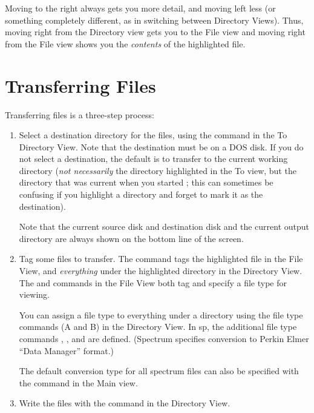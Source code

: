 Moving to the right always gets you more detail, and moving left less
(or something completely different, as in switching between Directory
Views).  Thus, moving right from the Directory view gets you to the
File view and moving right from the File view shows you the {\em
contents} of the highlighted file.
 
 
\section{Transferring Files}


Transferring files is a three-step process:

\begin{enumerate}
\item 
Select a destination directory for the files, using the
 command in the To Directory View.  Note that the
destination must be on a DOS disk.  If you do not select a
destination, the default is to transfer to the current working
directory ({\em not necessarily} the directory highlighted in the To
view, but the directory that was current when you started \RD; this
can sometimes be confusing if you highlight a directory and forget to
mark it as the destination).

Note that the current source disk and destination disk and the
current output directory are always shown on the bottom line of the
screen.

\item 
Tag some files to transfer.  The  command tags the
highlighted file in the File View, and {\em everything} under the
highlighted directory in the Directory View.  The  and
 commands in the File View both tag and specify a
file type for viewing.

You can assign a file type to everything under a directory using
the file type commands (A and B) in the Directory View.
In \RD sp,  the additional file type commands ,
, and  are defined.  (Spectrum
specifies conversion to Perkin Elmer ``Data Manager'' format.)

The default conversion type for all spectrum files can also be
specified with the  command in the Main view. 

\item
Write the files with the  command in the
Directory View.

\end{enumerate}


